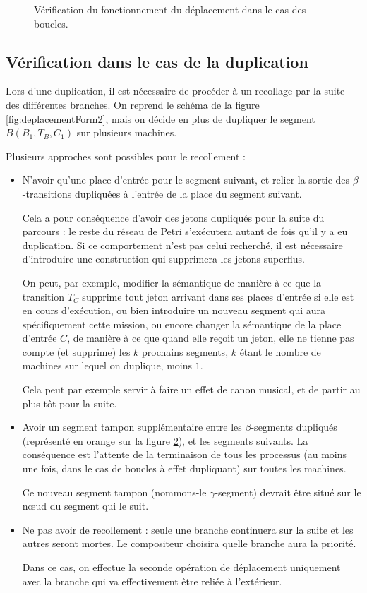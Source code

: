\begin{figure}[H]
\centering

\caption{Vérification du fonctionnement du déplacement dans le cas des boucles.}
\label{fig:verifBoucles}
\end{figure}


\subsection{Vérification dans le cas de la duplication}
\label{section:synchroPetri}
Lors d'une duplication, il est nécessaire de procéder à un recollage par la suite des différentes branches. On reprend le schéma de la figure \ref{fig:deplacementForm2}, mais on décide en plus de dupliquer le segment $B(B_1, T_B, C_1)$ sur plusieurs machines.

Plusieurs approches sont possibles pour le recollement : 
\begin{itemize}
\item N'avoir qu'une place d'entrée pour le segment suivant, et relier la sortie des $\beta$-transitions dupliquées à l'entrée de la place du segment suivant.

Cela a pour conséquence d'avoir des jetons dupliqués pour la suite du parcours : le reste du réseau de Petri s'exécutera autant de fois qu'il y a eu duplication. Si ce comportement n'est pas celui recherché, il est nécessaire d'introduire une construction qui supprimera les jetons superflus. 

On peut, par exemple, modifier la sémantique de manière à ce que la transition $T_C$ supprime tout jeton arrivant dans ses places d'entrée si elle est en cours d'exécution, ou bien introduire un nouveau segment qui aura spécifiquement cette mission, ou encore changer la sémantique de la place d'entrée $C$, de manière à ce que quand elle reçoit un jeton, elle ne tienne pas compte (et supprime) les $k$ prochains segments, $k$ étant le nombre de machines sur lequel on duplique, moins $1$.

Cela peut par exemple servir à faire un effet de canon musical, et de partir au plus tôt pour la suite.

\item Avoir un segment tampon supplémentaire entre les $\beta$-segments dupliqués (représenté en orange sur la figure \ref{fig.duplicationEtRecoll}), et les segments suivants.
La conséquence est l'attente de la terminaison de tous les processus (au moins une fois, dans le cas de boucles à effet dupliquant) sur toutes les machines.

Ce nouveau segment tampon (nommons-le $\gamma$-segment) devrait être situé sur le nœud du segment qui le suit.
\item Ne pas avoir de recollement : seule une branche continuera sur la suite et les autres seront mortes.  Le compositeur choisira quelle branche aura la priorité.

Dans ce cas, on effectue la seconde opération de déplacement uniquement avec la branche qui va effectivement être reliée à l'extérieur.
\end{itemize}

\begin{figure}[h!]
\centering

\label{fig.duplicationEtRecoll}
\end{figure}
